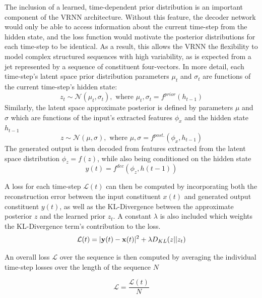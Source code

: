 \documentclass[12pt, a4paper]{article}
\begin{document}
The inclusion of a learned, time-dependent prior distribution is an important component of the VRNN architecture. Without this feature, the decoder network would only be able to access information about the current time-step from the hidden state, and the loss function would motivate the posterior distributions for each time-step to be identical. As a result, this allows the VRNN the flexibility to model complex structured sequences with high variability, as is expected from a jet represented by a sequence of constituent four-vectors.
In more detail, each time-step's latent space prior distribution parameters $\mu_{t}$ and $\sigma_{t}$ are functions of the current time-step's hidden state:
\begin{equation}
	z_{t} \sim \mathcal{N}(\mu_{t}, \sigma_{t}), \text{ where } \mu_{t}, \sigma_{t} = f^{prior}(h_{t-1})
\end{equation} 
Similarly, the latent space approximate posterior is defined by parameters $\mu$ and $\sigma$ which are functions of the input's extracted features $\phi_{x}$ and the hidden state $h_{t-1}$
\begin{equation}
	z \sim \mathcal{N}(\mu, \sigma), \text{ where } \mu, \sigma = f^{post.}(\phi_{x}, h_{t-1})
\end{equation} 
The generated output is then decoded from features extracted from the latent space distribution $\phi_{z} = f(z)$, while also being conditioned on the hidden state
\begin{equation}
y(t) = f^{dec}(\phi_{z}, h(t-1))
\end{equation} 

A loss for each time-step $\mathcal{L}(t)$ can then be computed by incorporating both the reconstruction error between the input constituent $x(t)$ and generated output constituent $y(t)$, as well as the KL-Divergence between the approximate posterior $z$ and the learned prior $z_{t}$. A constant $\lambda$ is also included which weights the KL-Divergence term's contribution to the loss. 
\begin{equation}
\mathcal{L}(t) = |{\bf y}(t) - {\bf x}(t)|^{2} + \lambda D_{KL}(z||z_{t})
\end{equation} 

An overall loss $\mathcal{L}$ over the sequence is then computed by averaging the individual time-step losses over the length of the sequence $N$

\begin{equation}
\mathcal{L} = \frac{\mathcal{L}(t)}{N}
\end{equation} 
\end{document}
